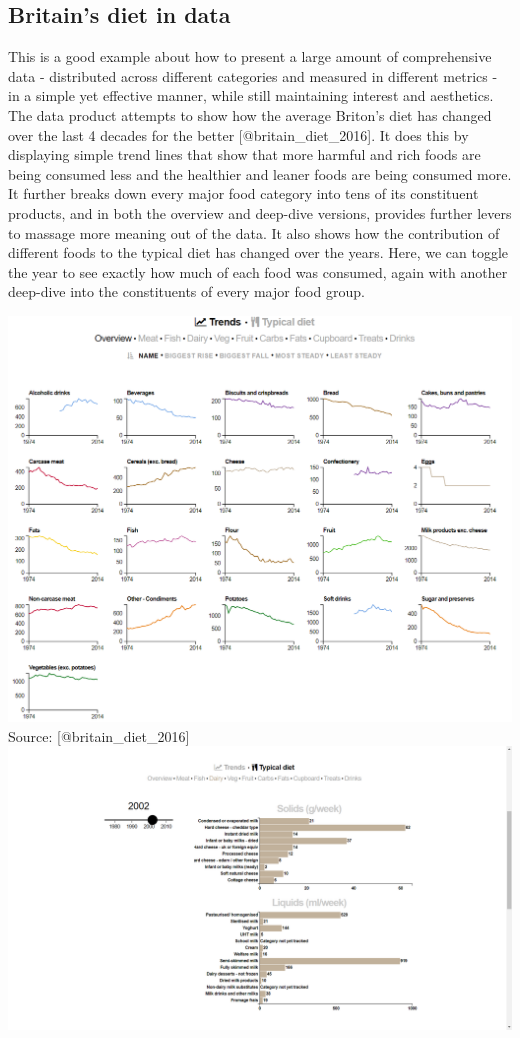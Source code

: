 \documentclass[]{book}
\theoremstyle{definition}
\theoremstyle{definition}
\theoremstyle{definition}
\theoremstyle{remark}
\begin{document}
\subsection{Britain's diet in data}\label{britains-diet-in-data}

This is a good example about how to present a large amount of
comprehensive data - distributed across different categories and
measured in different metrics - in a simple yet effective manner, while
still maintaining interest and aesthetics. The data product attempts to
show how the average Briton's diet has changed over the last 4 decades
for the better {[}@britain\_diet\_2016{]}. It does this by displaying
simple trend lines that show that more harmful and rich foods are being
consumed less and the healthier and leaner foods are being consumed
more. It further breaks down every major food category into tens of its
constituent products, and in both the overview and deep-dive versions,
provides further levers to massage more meaning out of the data. It also
shows how the contribution of different foods to the typical diet has
changed over the years. Here, we can toggle the year to see exactly how
much of each food was consumed, again with another deep-dive into the
constituents of every major food group.

\includegraphics{images/britain-diet-data-trends.PNG} Source:
{[}@britain\_diet\_2016{]}
\includegraphics{images/britain-diet-data-typical_diet.png}
\end{document}
